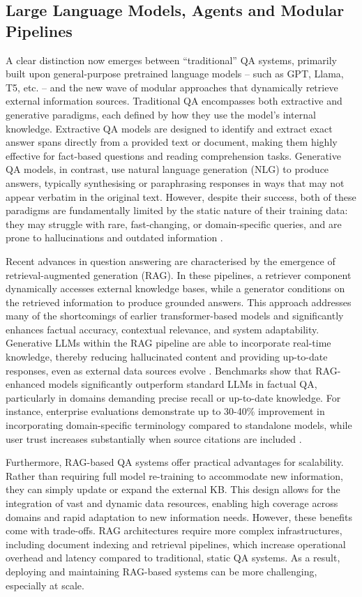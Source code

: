 \begin{spacing}{1.5}
\section{Large Language Models, Agents and Modular Pipelines}\label{sec:llm-agents}
A clear distinction now emerges between ``traditional'' QA systems, primarily built upon general-purpose pretrained language models -- such as GPT, Llama, T5, etc. -- and the new wave of modular approaches that dynamically retrieve external information sources. Traditional QA encompasses both extractive and generative paradigms, each defined by how they use the model’s internal knowledge. Extractive QA models are designed to identify and extract exact answer spans directly from a provided text or document, making them highly effective for fact-based questions and reading comprehension tasks. Generative QA models, in contrast, use natural language generation (NLG) to produce answers, typically synthesising or paraphrasing responses in ways that may not appear verbatim in the original text. However, despite their success, both of these paradigms are fundamentally limited by the static nature of their training data: they may struggle with rare, fast-changing, or domain-specific queries, and are prone to hallucinations and outdated information \citep{farea_understanding_2025}.

Recent advances in question answering are characterised by the emergence of retrieval-augmented generation (RAG). In these pipelines, a retriever component dynamically accesses external knowledge bases, while a generator conditions on the retrieved information to produce grounded answers. This approach addresses many of the shortcomings of earlier transformer-based models and significantly enhances factual accuracy, contextual relevance, and system adaptability. Generative LLMs within the RAG pipeline are able to incorporate real-time knowledge, thereby reducing hallucinated content and providing up-to-date responses, even as external data sources evolve \citep{yue_survey_2025,lewis_retrieval-augmented_2020}. Benchmarks show that RAG-enhanced models significantly outperform standard LLMs in factual QA, particularly in domains demanding precise recall or up-to-date knowledge. For instance, enterprise evaluations demonstrate up to 30-40\% improvement in incorporating domain-specific terminology compared to standalone models, while user trust increases substantially when source citations are included \citep{vaibhav_retrieval-augmented_2025}.

Furthermore, RAG-based QA systems offer practical advantages for scalability. Rather than requiring full model re-training to accommodate new information, they can simply update or expand the external KB. This design allows for the integration of vast and dynamic data resources, enabling high coverage across domains and rapid adaptation to new information needs. However, these benefits come with trade-offs. RAG architectures require more complex infrastructures, including document indexing and retrieval pipelines, which increase operational overhead and latency compared to traditional, static QA systems. As a result, deploying and maintaining RAG-based systems can be more challenging, especially at scale.


\end{spacing}
